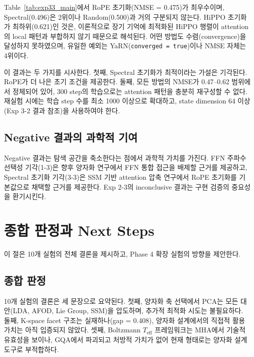 \documentclass[11pt,a4paper]{article}
\newcommand{\teff}{T_\mathrm{eff}}
\begin{document}
Table~\ref{tab:exp33_main}에서 RoPE 초기화(NMSE = 0.475)가 최우수이며, Spectral(0.496)은 2위이나 Random(0.500)과 거의 구분되지 않는다.
HiPPO 초기화가 최하위(0.621)인 것은, 이론적으로 장기 기억에 최적화된 HiPPO 행렬이 attention의 local 패턴과 부합하지 않기 때문으로 해석된다.
어떤 방법도 수렴(convergence)을 달성하지 못하였으며, 유일한 예외는 YaRN(\texttt{converged = true})이나 NMSE 자체는 4위이다.

이 결과는 두 가지를 시사한다.
첫째, Spectral 초기화가 최적이라는 가설은 기각된다. RoPE가 더 나은 초기 조건을 제공한다.
둘째, 모든 방법의 NMSE가 0.47--0.62 범위에서 정체되어 있어, 300 step의 학습으로는 attention 패턴을 충분히 재구성할 수 없다.
재실험 시에는 학습 step 수를 최소 1000 이상으로 확대하고, state dimension 64 이상(Exp 3-2 결과 참조)을 사용하여야 한다.

\subsection{Negative 결과의 과학적 기여}

Negative 결과는 탐색 공간을 축소한다는 점에서 과학적 가치를 가진다.
FFN 주파수 선택성 기각(1-3)은 향후 양자화 연구에서 FFN 통합 접근을 배제할 근거를 제공하고, Spectral 초기화 기각(3-3)은 SSM 기반 attention 압축 연구에서 RoPE 초기화를 기본값으로 채택할 근거를 제공한다.
Exp 2-3의 inconclusive 결과는 구현 검증의 중요성을 환기시킨다.

\section{종합 판정과 Next Steps}

이 절은 10개 실험의 전체 결론을 제시하고, Phase 4 확장 실험의 방향을 제안한다.

\subsection{종합 판정}

10개 실험의 결론은 세 문장으로 요약된다.
첫째, 양자화 축 선택에서 PCA는 모든 대안(LDA, AFOD, Lie Group, SSM)을 압도하며, 추가적 최적화 시도는 불필요하다.
둘째, K-space facet 구조는 실재하나(gap = 0.408), 양자화 설계에서의 직접적 활용 가치는 아직 입증되지 않았다.
셋째, Boltzmann $\teff$ 프레임워크는 MHA에서 기술적 유효성을 보이나, GQA에서 파괴되고 처방적 가치가 없어 현재 형태로는 양자화 설계 도구로 부적합하다.
\end{document}
